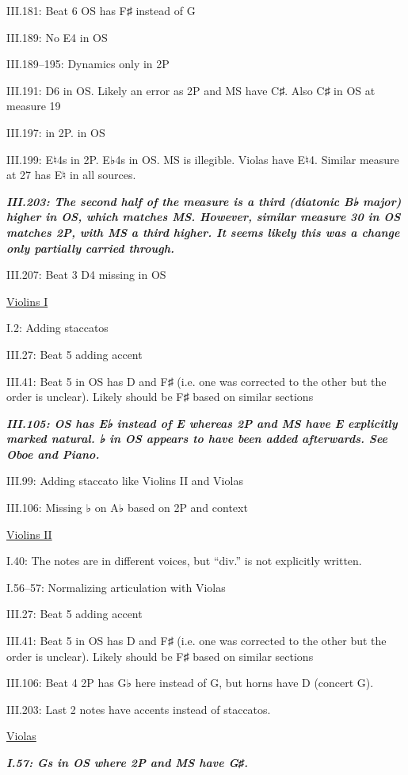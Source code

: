 \documentclass[twoside]{article}
\newcommand\dynmark[1]{\scalebox{0.9}{#1}{\kern1pt}}
\begin{document}
\begin{hangparas}{15pt}{1}
\begin{multicols}{2}
III.181: Beat 6 OS has F♯ instead of G

III.189: No E4 in OS

III.189--195: Dynamics only in 2P

III.191: D6 in OS. Likely an error as 2P and MS have C♯. Also C♯ in OS at measure 19

III.197: \dynmark{\f} in 2P. \dynmark{\ff} in OS

III.199: E♮4s in 2P. E♭4s in OS. MS is illegible. Violas have E♮4. Similar measure at 27 has E♮ in all sources.

\textbf{\textit{III.203: The second half of the measure is a third (diatonic B♭ major) higher in OS, which matches MS. However, similar measure 30 in OS matches 2P, with MS a third higher. It seems likely this was a change only partially carried through.}}

III.207: Beat 3 D4 missing in OS

\underline{Violins I}

I.2: Adding staccatos

III.27: Beat 5 adding accent

III.41: Beat 5 in OS has D and F♯ (i.e. one was corrected to the other but the order is unclear). Likely should be F♯ based on similar sections

\textbf{\textit{III.105: OS has E♭ instead of E whereas 2P and MS have E explicitly marked natural. ♭ in OS appears to have been added afterwards. See Oboe and Piano.}}

III.99: Adding staccato like Violins II and Violas

III.106: Missing ♭ on A♭ based on 2P and context

\columnbreak

\underline{Violins II}

I.40: The notes are in different voices, but ``div.'' is not explicitly written.

I.56--57: Normalizing articulation with Violas

III.27: Beat 5 adding accent

III.41: Beat 5 in OS has D and F♯ (i.e. one was corrected to the other but the order is unclear). Likely should be F♯ based on similar sections

III.106: Beat 4 2P has G♭ here instead of G, but horns have D (concert G).

III.203: Last 2 notes have accents instead of staccatos.

\underline{Violas}

\textbf{\textit{I.57: Gs in OS where 2P and MS have G♯.}}


\end{multicols}
\end{hangparas}
\end{document}
